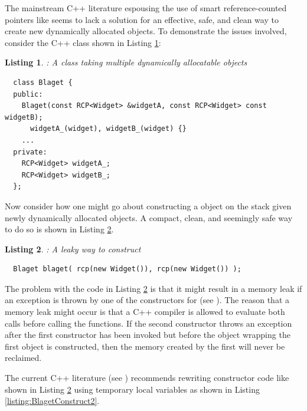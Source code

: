\documentclass[pdf,ps2pdf,11pt]{SANDreport}
\newtheorem{listing}{Listing}
\begin{document}
The mainstream C++ literature espousing the use of smart
reference-counted pointers like {} seems to
lack a solution for an effective, safe, and clean way to create new
dynamically allocated objects.  To demonstrate the issues involved,
consider the C++ class {} shown in Listing
{}\ref{listing:BlagetClass}:

\begin{listing}: A class taking multiple dynamically allocatable objects \\
\label{listing:BlagetClass}
{\small\begin{verbatim}
  class Blaget {
  public:
    Blaget(const RCP<Widget> &widgetA, const RCP<Widget> const widgetB);
      widgetA_(widget), widgetB_(widget) {}
    ...
  private:
    RCP<Widget> widgetA_;
    RCP<Widget> widgetB_;
  };
\end{verbatim}}
\end{listing}

Now consider how one might go about constructing a {}
object on the stack given newly dynamically allocated {}
objects.  A compact, clean, and seemingly safe way to do so is shown
in Listing {}\ref{listing:BlagetConstruct1}.

\begin{listing}: A leaky way to construct \\
\label{listing:BlagetConstruct1}
{\small\begin{verbatim}
  Blaget blaget( rcp(new Widget()), rcp(new Widget()) );
\end{verbatim}}
\end{listing}

The problem with the code in Listing {}\ref{listing:BlagetConstruct1}
is that it might result in a memory leak if an exception is thrown by
one of the constructors for {} (see {}\cite[Item
13]{C++CodingStandards05}).  The reason that a memory leak might occur
is that a C++ compiler is allowed to evaluate both {} calls before calling the {} functions.
If the second constructor {} throws an exception
after the first {} constructor has been invoked
but before the {} object wrapping the first
{} object is constructed, then the memory created by
the first {} will never be reclaimed.

The current C++ literature (see {}\cite[Item
13]{C++CodingStandards05}) recommends rewriting constructor code like
shown in Listing {}\ref{listing:BlagetConstruct1} using temporary local
variables as shown in Listing {}\ref{listing:BlagetConstruct2}.
\end{document}

